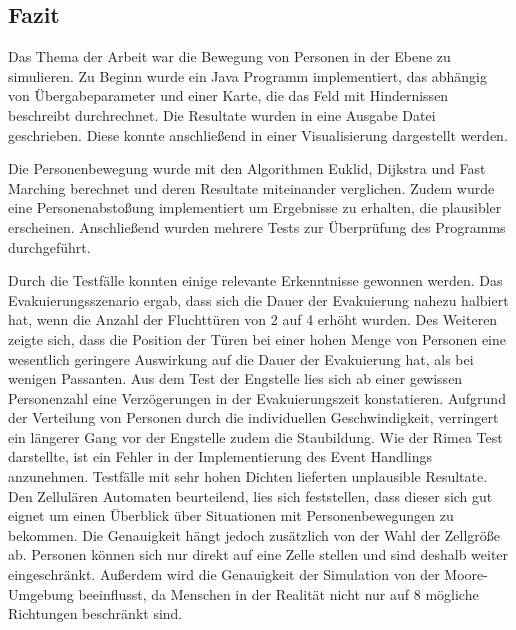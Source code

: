 \subsection{Fazit}
Das Thema der Arbeit war die Bewegung von Personen in der Ebene zu simulieren. Zu Beginn wurde ein Java Programm implementiert, das abhängig von Übergabeparameter und einer Karte, die das Feld mit Hindernissen beschreibt durchrechnet. Die Resultate wurden in eine Ausgabe Datei geschrieben. Diese konnte anschließend in einer Visualisierung dargestellt werden.

Die Personenbewegung wurde mit den Algorithmen Euklid, Dijkstra und Fast Marching berechnet und deren Resultate miteinander verglichen. Zudem wurde eine Personenabstoßung implementiert um Ergebnisse zu erhalten, die plausibler erscheinen. Anschließend wurden mehrere Tests zur Überprüfung des Programms durchgeführt.

Durch die Testfälle konnten einige relevante Erkenntnisse gewonnen werden. Das Evakuierungsszenario ergab, dass sich die Dauer der Evakuierung nahezu halbiert hat, wenn die Anzahl der Fluchttüren von 2 auf 4 erhöht wurden. Des Weiteren zeigte sich, dass die Position der Türen bei einer hohen Menge von Personen eine wesentlich geringere Auswirkung auf die Dauer der Evakuierung hat, als bei wenigen Passanten. Aus dem Test der Engstelle lies sich ab einer gewissen Personenzahl eine Verzögerungen in der Evakuierungszeit konstatieren. Aufgrund der Verteilung von Personen durch die individuellen Geschwindigkeit, verringert ein längerer Gang vor der Engstelle zudem die Staubildung. Wie der Rimea Test darstellte, ist ein Fehler in der Implementierung des Event Handlings anzunehmen. Testfälle mit sehr hohen Dichten lieferten unplausible Resultate. Den Zellulären Automaten beurteilend, lies sich feststellen, dass dieser sich gut eignet um einen Überblick über Situationen mit Personenbewegungen zu bekommen. Die Genauigkeit hängt jedoch zusätzlich von der Wahl der Zellgröße ab. Personen können sich nur direkt auf eine Zelle stellen und sind deshalb weiter eingeschränkt. Außerdem wird die Genauigkeit der Simulation von der Moore-Umgebung beeinflusst, da Menschen in der Realität nicht nur auf 8 mögliche Richtungen beschränkt sind.

